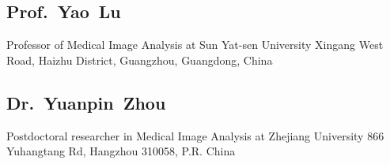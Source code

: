 \documentclass[10pt,a4paper,final]{moderncv}
\begin{document}
	\subsection{\textbf{Prof.~Yao~Lu}}
		\cvline{}
		{Professor of Medical Image Analysis at Sun Yat-sen University}
		{Xingang West Road, Haizhu District, Guangzhou, Guangdong, China}
	\subsection{\textbf{Dr.~Yuanpin~Zhou}}
		\cvline{}
		{Postdoctoral researcher in Medical Image Analysis at Zhejiang University}
		{866 Yuhangtang Rd, Hangzhou 310058, P.R. China}





% 
% 
\end{document}
